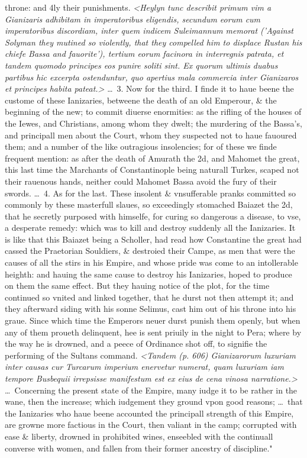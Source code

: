 \documentclass[12pt]{article}
\begin{document}
{throne: and 4ly their punishments. \textit{<Heylyn tunc describit primum vim a Gianizaris adhibitam in imperatoribus eligendis, secundum eorum cum imperatoribus discordiam, inter quem indicem Suleimannum memorat ('Against Solyman they mutined so violently, that they compelled him to displace Rustan his chiefe Bassa and fauorite'), tertium eorum facinora in interregnis patrata, et tandem quomodo principes eos punire soliti sint. Ex quorum ultimis duabus partibus hic excerpta ostenduntur, quo apertius mala commercia inter Gianizaros et principes habita pateat.>} \dots\ 3. Now for the third. I finde it to haue beene the custome of these Ianizaries, betweene the death of an old Emperour, \& the beginning of the new; to commit diuerse enormities: as the rifling of the houses of the Iewes, and Christians, among whom they dwelt; the murdering of the Bassa's, and principall men about the Court, whom they suspected not to haue fauoured them; and a number of the like outragious insolencies; for of these we finde frequent mention: as after the death of Amurath the 2d, and Mahomet the great, this last time the Marchants of Constantinople being naturall Turkes, scaped not their rauenous hands, neither could Mahomet Bassa avoid the fury of their swords. \dots\ 4. As for the last. These insolent \& vnsufferable pranks committed so commonly by these masterfull slaues, so exceedingly stomached Baiazet the 2d, that he secretly purposed with himselfe, for curing so dangerous a disease, to vse, a desperate remedy: which was to kill and destroy suddenly all the Ianizaries. It is like that this Baiazet being a Scholler, had read how Constantine the great had cassed the Praetorian Souldiers, \& destroied their Campe, as men that were the causes of all the stirs in his Empire, and whose pride was come to an intollerable heighth: and hauing the same cause to destroy his Ianizaries, hoped to produce on them the same effect. But they hauing notice of the plot, for the time continued so vnited and linked together, that he durst not then attempt it; and they afterward siding with his sonne Selimus, cast him out of his throne into his graue. Since which time the Emperors neuer durst punish them openly, but when any of them proueth delinquent, hee is sent priuily in the night to Pera; where by the way he is drowned, and a peece of Ordinance shot off, to signifie the performing of the Sultans command. \textit{<Tandem (p. 606) Gianizarorum luxuriam inter causas cur Turcarum imperium enervetur numerat, quam luxuriam iam tempore Busbequii irrepsisse manifestum est ex eius de cena vinosa narratione.>} \dots\ Concerning the present state of the Empire, many iudge it to be rather in the wane, then the increase; which iudgement they ground vpon good reasons; \dots\ that the Ianizaries who haue beene accounted the principall strength of this Empire, are growne more factious in the Court, then valiant in the camp; corrupted with ease \& liberty, drowned in prohibited wines, enseebled with the continuall converse with women, and fallen from their former ancestry of discipline."
		
}
\end{document}
